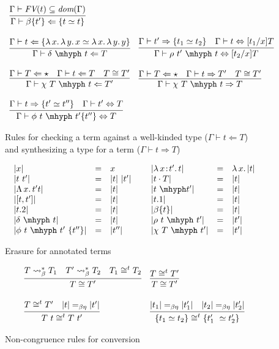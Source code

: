 \documentclass{article}
\newcommand{\abs}[4]{{#1}\, #2\! : \! #3.\, #4}
\newcommand{\absu}[3]{{#1}\, #2.\, #3}
\newcommand{\tpcheck}[0]{\Leftarrow}
\newcommand{\tpsynth}[0]{\Rightarrow}
\begin{document}
\begin{figure}
\[\begin{array}{ll}
    \infer{\Gamma\vdash \beta\{t'\} \tpcheck \{ t \simeq t \}}{\Gamma\vdash \textit{FV}(t)\subseteq \textit{dom}(\Gamma)}  \\ \\    
    \infer{\Gamma\vdash \delta\ \mhyph\ t \tpcheck T}{\Gamma\vdash t\tpcheck \{ \absu{\lambda}{x}{\absu{\lambda}{y}{x}} \simeq \absu{\lambda}{x}{\absu{\lambda}{y}{y}}\}}  &
    \infer{\Gamma\vdash \rho\ t'\ \mhyph\ t \Leftrightarrow [t_2/x]T}
          {\Gamma\vdash t' \tpsynth \{ t_1 \simeq t_2 \} & \Gamma \vdash t \Leftrightarrow [t_1/x]T} \\ \\
    \infer{\Gamma\vdash \chi\ T\ \mhyph\ t \tpcheck T'}
          {\Gamma\vdash T\tpcheck \star & \Gamma\vdash t \tpcheck T & T \cong T'} &
    \infer{\Gamma\vdash \chi\ T\ \mhyph\ t \tpsynth T}
          {\Gamma\vdash T\tpcheck \star & \Gamma\vdash t \tpsynth T' & T \cong T'} \\ \\
    \infer{\Gamma\vdash \phi\ t\ \mhyph\ t'\{t''\} \Leftrightarrow T}
          {\Gamma\vdash t\tpsynth \{t'\simeq t''\} & \Gamma\vdash t' \Leftrightarrow T}  & \
  \end{array}
  \]
\caption{Rules for checking a term against a well-kinded type ($\Gamma \vdash t \tpcheck T$)
           and synthesizing a type for a term ($\Gamma \vdash t \tpsynth T$)}
\label{fig:tp}
\end{figure}


\begin{figure}
  \[
  \begin{array}{lllllll}
    |x| & = & x &\ &
    |\abs{\lambda}{x}{t'}{t}| & = & \absu{\lambda}{x}{|t|} \\
    |t\ t'| & = & |t|\ |t'| &\ &
    |t\cdot T| & = & |t| \\
    |\absu{\Lambda}{x}{t'}{t}| & = & |t| &\ &
    |t\ \mhyph t'| & = & |t| \\
    |[t , t']| & = & |t| &\ &
    |t.1| & = & |t| \\
    |t.2| & = & |t| &\ &
    |\beta\{t\}| & = & |t|\\
    |\delta\ \mhyph\ t| & = & |t|&\ &
    |\rho\ t\ \mhyph\ t'| & = & |t'| \\
    |\phi\ t\ \mhyph\ t'\ \{t''\}| & = & |t''| &\ &
    |\chi\ T\ \mhyph\ t'| & = & |t'|
  \end{array}
  \]
  \caption{Erasure for annotated terms}
  \label{fig:eraser}
\end{figure}  

\begin{figure}
  \[
  \begin{array}{ll}
    \infer{T \cong T'}{T \leadsto^*_\beta T_1 & T' \leadsto^*_\beta T_2 & T_1\cong^t T_2}  & 
    \infer{T \cong T'}{T \cong^t T'} \\ \\
    \infer{T\ t \cong^t T\ t'}{T \cong^t T' & |t| =_{\beta\eta} |t'|} &
    \infer{\{ t_1 \simeq t_2 \} \cong^t \{ t_1'\ \simeq t_2' \}}{|t_1| =_{\beta\eta} |t_1'| & |t_2| =_{\beta\eta} |t_2'|}
  \end{array}
  \]
  \caption{Non-congruence rules for conversion}
  \label{fig:conv}
\end{figure}  
\end{document}
